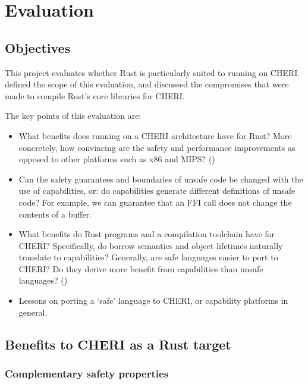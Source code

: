 \documentclass[dissertation.tex]{subfiles}
\begin{document}
\chapter{Evaluation}
\label{ch:eval}

\section{Objectives}
This project evaluates whether Rust is particularly suited to running on
CHERI.
 defined the scope of this evaluation, and
discussed the compromises that were made to compile Rust's core
libraries for CHERI.

The key points of this evaluation are:

\begin{itemize}
    \item What benefits does running on a CHERI architecture have for Rust?
    More concretely, how convincing are the safety and performance
    improvements as opposed to other platforms such as x86 and MIPS?
    ()
    \item Can the safety guarantees and boundaries of unsafe code be
    changed with the use of capabilities, or: do capabilities generate
    different definitions of unsafe code?
    For example, we can guarantee that an FFI call does not change the
    contents of a buffer.
    \item What benefits do Rust programs and a compilation toolchain
    have for CHERI?
    Specifically, do borrow semantics and object lifetimes naturally
    translate to capabilities?
    Generally, are safe languages easier to port to CHERI? Do they
    derive more benefit from capabilities than unsafe languages?
    ()
    \item Lessons on porting a `safe' language to CHERI, or capability
    platforms in general. 
\end{itemize}


\section{Benefits to CHERI as a Rust target}
\label{sec:eval-cheri}

\subsection{Complementary safety properties}
\end{document}
